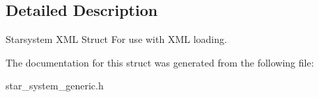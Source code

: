 \subsection{Detailed Description}
Starsystem X\+ML Struct For use with X\+ML loading. 

The documentation for this struct was generated from the following file\+:\begin{DoxyCompactItemize}
\item 
star\+\_\+system\+\_\+generic.\+h\end{DoxyCompactItemize}
